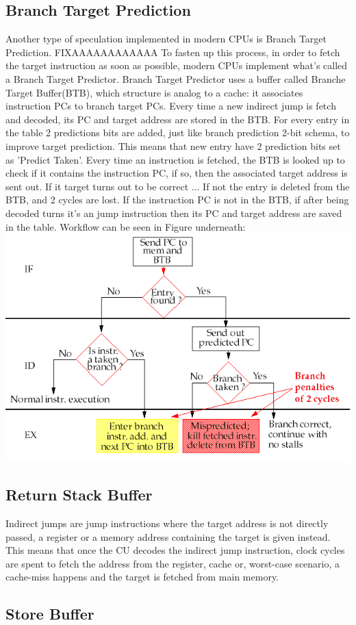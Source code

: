 \subsection{Branch Target Prediction}
Another type of speculation implemented in modern CPUs is Branch Target Prediction.
FIXAAAAAAAAAAAA
To fasten up this process, in order to fetch the target instruction as soon as possible, modern CPUs implement what's called a Branch Target Predictor.
Branch Target Predictor uses a buffer called Branche Target Buffer(BTB), which structure is analog to a cache: it associates instruction PCs to branch target PCs. Every time a new indirect jump is fetch and decoded, its PC and target address are stored in the BTB.
For every entry in the table 2 predictions bits are added, just like branch prediction 2-bit schema, to improve target prediction.
This means that new entry have 2 prediction bits set as 'Predict Taken'.
Every time an instruction is fetched, the BTB is looked up to check if it contains the instruction PC, if so, then the associated target address is sent out.
If it target turns out to be correct ...
If not the entry is deleted from the BTB, and 2 cycles are lost.
If the instruction PC is not in the BTB, if after being decoded turns it's an jump instruction then its PC and target address are saved in the table.
Workflow can be seen in Figure underneath:
\includegraphics[scale=0.35]{img/BTB.png}

\subsection{Return Stack Buffer}
Indirect jumps are jump instructions where the target address is not directly passed, a register or a memory address containing the target is given instead.
This means that once the CU decodes the indirect jump instruction, clock cycles are spent to fetch the address from the register, cache or, worst-case scenario, a cache-miss happens and the target is fetched from main memory.

\subsection{Store Buffer}
